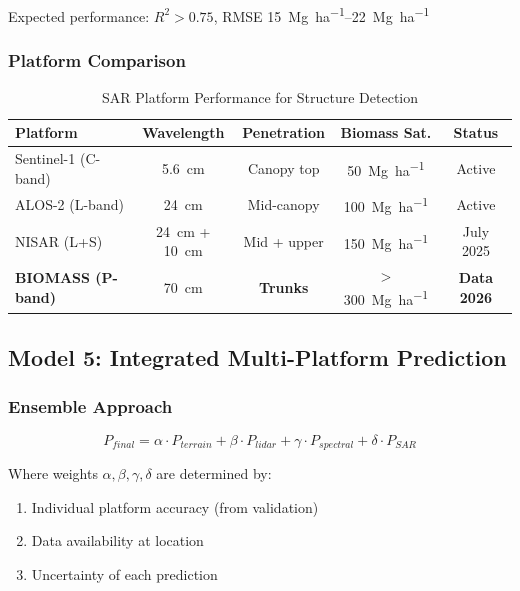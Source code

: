 \documentclass[11pt,letterpaper]{article}
\begin{document}
Expected performance: $R^2 > 0.75$, RMSE \SIrange{15}{22}{Mg~ha^{-1}}

\subsubsection{Platform Comparison}

\begin{table}[h]
\centering
\caption{SAR Platform Performance for Structure Detection}
\label{tab:sar_model_performance}
\begin{tabular}{lcccc}
\toprule
\textbf{Platform} & \textbf{Wavelength} & \textbf{Penetration} & \textbf{Biomass Sat.} & \textbf{Status} \\
\midrule
Sentinel-1 (C-band) & \SI{5.6}{cm} & Canopy top & \SI{50}{Mg~ha^{-1}} & Active \\
ALOS-2 (L-band) & \SI{24}{cm} & Mid-canopy & \SI{100}{Mg~ha^{-1}} & Active \\
NISAR (L+S) & \SI{24}{cm} + \SI{10}{cm} & Mid + upper & \SI{150}{Mg~ha^{-1}} & July 2025 \\
\textbf{BIOMASS (P-band)} & \SI{70}{cm} & \textbf{Trunks} & $>$\SI{300}{Mg~ha^{-1}} & \textbf{Data 2026} \\
\bottomrule
\end{tabular}
\end{table}

\subsection{Model 5: Integrated Multi-Platform Prediction}

\subsubsection{Ensemble Approach}

\begin{equation}
P_{final} = \alpha \cdot P_{terrain} + \beta \cdot P_{lidar} + \gamma \cdot P_{spectral} + \delta \cdot P_{SAR}
\end{equation}

Where weights $\alpha, \beta, \gamma, \delta$ are determined by:
\begin{enumerate}[noitemsep]
    \item Individual platform accuracy (from validation)
    \item Data availability at location
    \item Uncertainty of each prediction
\end{enumerate}
\end{document}
